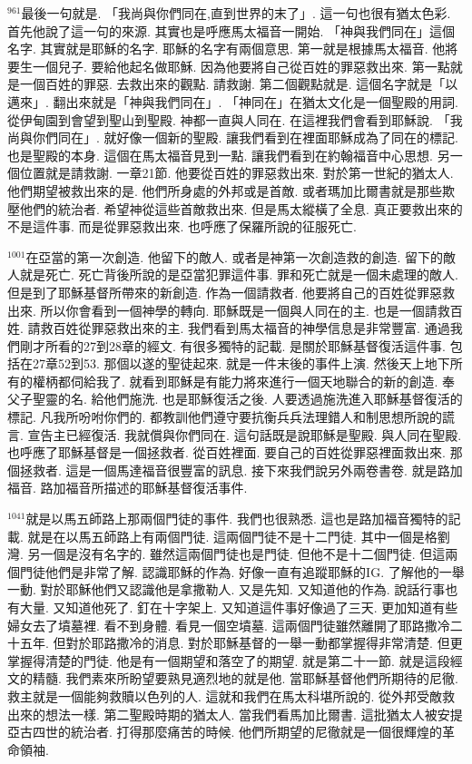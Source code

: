 \documentclass{book}
\begin{document}
$^{961}$最後一句就是.
「我尚與你們同在,直到世界的末了」.
這一句也很有猶太色彩.
首先他說了這一句的來源.
其實也是呼應馬太福音一開始.
「神與我們同在」這個名字.
其實就是耶穌的名字.
耶穌的名字有兩個意思.
第一就是根據馬太福音.
他將要生一個兒子.
要給他起名做耶穌.
因為他要將自己從百姓的罪惡救出來.
第一點就是一個百姓的罪惡.
去救出來的觀點.
請救謝.
第二個觀點就是.
這個名字就是「以邁來」.
翻出來就是「神與我們同在」.
「神同在」在猶太文化是一個聖殿的用詞.
從伊甸園到會望到聖山到聖殿.
神都一直與人同在.
在這裡我們會看到耶穌說.
「我尚與你們同在」.
就好像一個新的聖殿.
讓我們看到在裡面耶穌成為了同在的標記.
也是聖殿的本身.
這個在馬太福音見到一點.
讓我們看到在約翰福音中心思想.
另一個位置就是請救謝.
一章21節.
他要從百姓的罪惡救出來.
對於第一世紀的猶太人.
他們期望被救出來的是.
他們所身處的外邦或是首敵.
或者瑪加比爾書就是那些欺壓他們的統治者.
希望神從這些首敵救出來.
但是馬太縱橫了全息.
真正要救出來的不是這件事.
而是從罪惡救出來.
也呼應了保羅所說的征服死亡.

$^{1001}$在亞當的第一次創造.
他留下的敵人.
或者是神第一次創造救的創造.
留下的敵人就是死亡.
死亡背後所說的是亞當犯罪這件事.
罪和死亡就是一個未處理的敵人.
但是到了耶穌基督所帶來的新創造.
作為一個請救者.
他要將自己的百姓從罪惡救出來.
所以你會看到一個神學的轉向.
耶穌既是一個與人同在的主.
也是一個請救百姓.
請救百姓從罪惡救出來的主.
我們看到馬太福音的神學信息是非常豐富.
通過我們剛才所看的27到28章的經文.
有很多獨特的記載.
是關於耶穌基督復活這件事.
包括在27章52到53.
那個以遂的聖徒起來.
就是一件末後的事件上演.
然後天上地下所有的權柄都伺給我了.
就看到耶穌是有能力將來進行一個天地聯合的新的創造.
奉父子聖靈的名.
給他們施洗.
也是耶穌復活之後.
人要透過施洗進入耶穌基督復活的標記.
凡我所吩咐你們的.
都教訓他們遵守要抗衡兵兵法理錯人和制思想所說的謊言.
宣告主已經復活.
我就償與你們同在.
這句話既是說耶穌是聖殿.
與人同在聖殿.
也呼應了耶穌基督是一個拯救者.
從百姓裡面.
要自己的百姓從罪惡裡面救出來.
那個拯救者.
這是一個馬達福音很豐富的訊息.
接下來我們說另外兩卷書卷.
就是路加福音.
路加福音所描述的耶穌基督復活事件.

$^{1041}$就是以馬五師路上那兩個門徒的事件.
我們也很熟悉.
這也是路加福音獨特的記載.
就是在以馬五師路上有兩個門徒.
這兩個門徒不是十二門徒.
其中一個是格劉灣.
另一個是沒有名字的.
雖然這兩個門徒也是門徒.
但他不是十二個門徒.
但這兩個門徒他們是非常了解.
認識耶穌的作為.
好像一直有追蹤耶穌的IG.
了解他的一舉一動.
對於耶穌他們又認識他是拿撒勒人.
又是先知.
又知道他的作為.
說話行事也有大量.
又知道他死了.
釘在十字架上.
又知道這件事好像過了三天.
更加知道有些婦女去了墳墓裡.
看不到身體.
看見一個空墳墓.
這兩個門徒雖然離開了耶路撒冷二十五年.
但對於耶路撒冷的消息.
對於耶穌基督的一舉一動都掌握得非常清楚.
但更掌握得清楚的門徒.
他是有一個期望和落空了的期望.
就是第二十一節.
就是這段經文的精髓.
我們素來所盼望要熟見適烈地的就是他.
當耶穌基督他們所期待的尼徹.
救主就是一個能夠救贖以色列的人.
這就和我們在馬太科堪所說的.
從外邦受敵救出來的想法一樣.
第二聖殿時期的猶太人.
當我們看馬加比爾書.
這批猶太人被安提亞古四世的統治者.
打得那麼痛苦的時候.
他們所期望的尼徹就是一個很輝煌的革命領袖.
\end{document}
